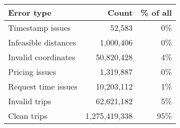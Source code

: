 \begin{tabular}{lrr}
\toprule
Error type & Count & \% of all \\
\midrule
Timestamp issues & 52,583 & 0\% \\
Infeasible distances & 1,000,406 & 0\% \\
Invalid coordinates & 50,820,428 & 4\% \\
Pricing issues & 1,319,887 & 0\% \\
Request time issues & 10,203,112 & 1\% \\
\midrule
Invalid trips & 62,621,182 & 5\% \\
Clean trips & 1,275,419,338 & 95\% \\
\bottomrule
\end{tabular}